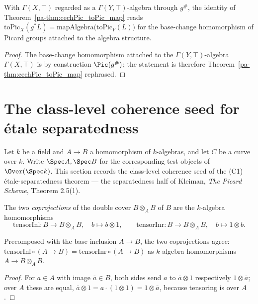 \begin{theorem}
  \label{pa-thm:cechPic_toPic_mapAlgebra}
  \leanok

  With \(\Gamma(X, \top)\) regarded as a \(\Gamma(Y, \top)\)-algebra through \(g^{\#}\), the
  identity of Theorem~\ref{pa-thm:cechPic_toPic_map} reads \(\mathrm{toPic}_X(g^{*} L) =
  \mathrm{mapAlgebra}\bigl(\mathrm{toPic}_Y(L)\bigr)\) for the base-change homomorphism of
  Picard groups attached to the algebra structure.
\end{theorem}
\begin{proof}
  \leanok
  The base-change homomorphism attached to the \(\Gamma(Y, \top)\)-algebra \(\Gamma(X, \top)\)
  is by construction \(\Pic(g^{\#})\); the statement is therefore
  Theorem~\ref{pa-thm:cechPic_toPic_map} rephrased.
\end{proof}

\section{The class-level coherence seed for \'etale separatedness}
\label{pa-sec:etaleSeparatedness}

Let \(k\) be a field and \(A \to B\) a homomorphism of \(k\)-algebras, and let \(C\) be a curve
over \(k\).  Write \(\Spec A, \Spec B\) for the corresponding test objects of \(\Over(\Spec
k)\).  This section records the class-level coherence seed of the (C1) \'etale-separatedness
theorem — the separatedness half of Kleiman, \emph{The Picard Scheme}, Theorem 2.5(1).

\begin{definition}
  \label{pa-def:tensorInl_tensorInr}
  \leanok

  The two \emph{coprojections} of the double cover \(B \otimes_A B\) of \(B\) are the
  \(k\)-algebra homomorphisms
  \[
    \mathrm{tensorInl} \colon B \to B \otimes_A B, \quad b \mapsto b \otimes 1, \qquad
    \mathrm{tensorInr} \colon B \to B \otimes_A B, \quad b \mapsto 1 \otimes b.
  \]
\end{definition}

\begin{lemma}
  \label{pa-lem:tensorInl_comp_ofId}
  \leanok

  Precomposed with the base inclusion \(A \to B\), the two coprojections agree:
  \(\mathrm{tensorInl} \circ (A \to B) = \mathrm{tensorInr} \circ (A \to B)\) as \(k\)-algebra
  homomorphisms \(A \to B \otimes_A B\).
\end{lemma}
\begin{proof}
  \leanok
  For \(a \in A\) with image \(\bar a \in B\), both sides send \(a\) to \(\bar a \otimes 1\)
  respectively \(1 \otimes \bar a\); over \(A\) these are equal, \(\bar a \otimes 1 = a \cdot (1
  \otimes 1) = 1 \otimes \bar a\), because tensoring is over \(A\).
\end{proof}

